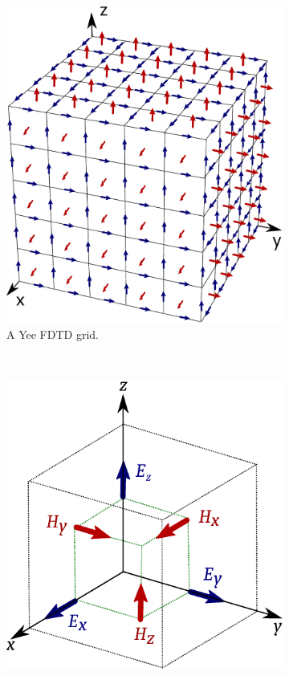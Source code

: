 \begin{figure}
    \centering
    \begin{subfigure}[b]{0.49\textwidth}
      \centering
        \includegraphics[scale=0.3]{img/analysis/fdtd_mesh}
        \caption{A Yee FDTD grid.}
        \label{fig:fdtd-grid}
    \end{subfigure}
    ~
    \begin{subfigure}[b]{0.49\textwidth}
      \centering
        \includegraphics[scale=0.7]{img/analysis/yee_3d}

\end{subfigure}
\end{figure}
